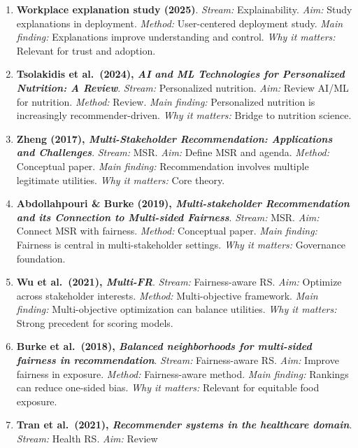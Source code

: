 \begin{enumerate}
  Healthy food RS. \emph{Aim:} Improve recommendation accuracy.
  \emph{Method:} ML model. \emph{Main finding:} Richer
  user-food-ingredient modeling improves personalization. \emph{Why it
  matters:} Useful for technical engine design.
\item
  \textbf{Workplace explanation study (2025)}. \emph{Stream:}
  Explainability. \emph{Aim:} Study explanations in deployment.
  \emph{Method:} User-centered deployment study. \emph{Main finding:}
  Explanations improve understanding and control. \emph{Why it matters:}
  Relevant for trust and adoption.
\item
  \textbf{Tsolakidis et al.~(2024), \emph{AI and ML Technologies for
  Personalized Nutrition: A Review}}. \emph{Stream:} Personalized
  nutrition. \emph{Aim:} Review AI/ML for nutrition. \emph{Method:}
  Review. \emph{Main finding:} Personalized nutrition is increasingly
  recommender-driven. \emph{Why it matters:} Bridge to nutrition
  science.
\item
  \textbf{Zheng (2017), \emph{Multi-Stakeholder Recommendation:
  Applications and Challenges}}. \emph{Stream:} MSR. \emph{Aim:} Define
  MSR and agenda. \emph{Method:} Conceptual paper. \emph{Main finding:}
  Recommendation involves multiple legitimate utilities. \emph{Why it
  matters:} Core theory.
\item
  \textbf{Abdollahpouri \& Burke (2019), \emph{Multi-stakeholder
  Recommendation and its Connection to Multi-sided Fairness}}.
  \emph{Stream:} MSR. \emph{Aim:} Connect MSR with fairness.
  \emph{Method:} Conceptual paper. \emph{Main finding:} Fairness is
  central in multi-stakeholder settings. \emph{Why it matters:}
  Governance foundation.
\item
  \textbf{Wu et al.~(2021), \emph{Multi-FR}}. \emph{Stream:}
  Fairness-aware RS. \emph{Aim:} Optimize across stakeholder interests.
  \emph{Method:} Multi-objective framework. \emph{Main finding:}
  Multi-objective optimization can balance utilities. \emph{Why it
  matters:} Strong precedent for scoring models.
\item
  \textbf{Burke et al.~(2018), \emph{Balanced neighborhoods for
  multi-sided fairness in recommendation}}. \emph{Stream:}
  Fairness-aware RS. \emph{Aim:} Improve fairness in exposure.
  \emph{Method:} Fairness-aware method. \emph{Main finding:} Rankings
  can reduce one-sided bias. \emph{Why it matters:} Relevant for
  equitable food exposure.
\item
  \textbf{Tran et al.~(2021), \emph{Recommender systems in the
  healthcare domain}}. \emph{Stream:} Health RS. \emph{Aim:} Review

\end{enumerate}
